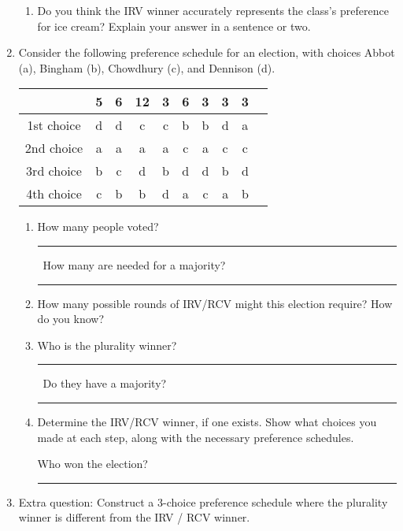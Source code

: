 \documentclass[12pt]{article}
\newcommand{\ans}[1][1in]{\rule{#1}{.5pt}}
\begin{document}
\begin{enumerate}
\begin{enumerate}
\item Do you think the IRV winner accurately represents the class's preference for ice cream? Explain your answer in a sentence or two. \vspace{1in}
\end{enumerate}

\newpage    

\item Consider the following preference schedule for an election, with choices Abbot (a), Bingham (b), Chowdhury (c), and Dennison (d).

\begin{tabular}{|c || c | c | c | c | c | c | c | c | c|}
\hline
& 5 & 6 & 12 & 3 & 6 & 3 & 3 & 3  \\ \hline
1st choice & d & d & c & c & b & b & d & a\\
2nd choice & a & a & a & a & c & a & c & c \\
3rd choice & b & c & d & b & d & d & b & d\\
4th choice &c & b & b & d & a & c & a & b\\
\hline
\end{tabular}

\begin{enumerate}
\item How many people voted? \ans\ How many are needed for a majority? \ans
\item How many possible rounds of IRV/RCV might this election require? How do you know?
\vspace{1cm}
\item Who is the plurality winner? \ans\ Do they have a majority? \ans

\vspace{1cm}

\item Determine the IRV/RCV winner, if one exists. Show what choices you made at each step, along with the necessary preference schedules.

\vfill
Who won the election? \ans[3in]

\end{enumerate}

\item Extra question: Construct a 3-choice preference schedule where the plurality winner is different from the IRV / RCV winner.


\end{enumerate}
\end{document}
